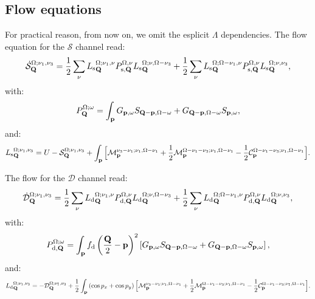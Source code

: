 \subsection{Flow equations}

For practical reason, from now on, we omit the esplicit $\Lambda$ dependencies.
The flow equation for the $\mathcal{S}$ channel read:
\begin{equation}
\dot{\mathcal{S}}_{\mathbf{Q}}^{\Omega;\nu_1,\nu_3} = 
  \frac{1}{2} \sum_{\nu}{L_\mathrm{s}}^{\Omega; \nu_1,\nu}_{\mathbf{Q}} P_{\mathrm{s},\mathbf{Q}}^{\Omega,\nu} {L_\mathrm{s}}^{\Omega; \nu,\Omega-\nu_3}_{\mathbf{Q}} 
+ \frac{1}{2} \sum_{\nu}{L_\mathrm{s}}^{\Omega; \Omega-\nu_1,\nu}_{\mathbf{Q}} P_{\mathrm{s},\mathbf{Q}}^{\Omega,\nu} {L_\mathrm{s}}^{\Omega; \nu,\nu_3}_{\mathbf{Q}},
\end{equation} 	   
with: 
\begin{equation}
P_{\mathbf{Q}}^{\Omega;\omega} = \int_{\mathbf{p}}  G_{\mathbf{p},\omega}S_{\mathbf{Q}-\mathbf{p},\Omega-\omega} +G_{\mathbf{Q}-\mathbf{p},\Omega-\omega}
S_{\mathbf{p},\omega}, 
\label{eq:app:P_pp}
\end{equation} 
and: 
\begin{align} 
{L_\mathrm{s}}^{\Omega;\nu_1,\nu_3}_{\mathbf{Q}}=U-\mathcal{S}_{\mathbf{Q}}^{\Omega;\nu_1,\nu_3}
+ \int_{\mathbf{p}}  \Big[ \mathcal{M}_{\mathbf{p}}^{\nu_3-\nu_1;\nu_1,\Omega-\nu_1} + \frac{1}{2} \mathcal{M}_{\mathbf{p}}^{\Omega-\nu_1-\nu_3;\nu_1,\Omega-\nu_1} - \frac{1}{2} \mathcal{C}_{\mathbf{p}}^{\Omega-\nu_1-\nu_3;\nu_1,\Omega-\nu_1} \Big]. 
\end{align}	 

The flow for the $\mathcal{D}$ channel read:
\begin{equation}
\dot{\mathcal{D}}_{\mathbf{Q}}^{\Omega;\nu_1,\nu_3} = 
  \frac{1}{2} \sum_{\nu}{L_\mathrm{d}}^{\Omega; \nu_1,\nu}_{\mathbf{Q}} P_{\mathrm{d},\mathbf{Q}}^{\Omega,\nu} {L_\mathrm{d}}^{\Omega; \nu,\Omega-\nu_3}_{\mathbf{Q}} 
+ \frac{1}{2} \sum_{\nu}{L_\mathrm{d}}^{\Omega; \Omega-\nu_1,\nu}_{\mathbf{Q}} P_{\mathrm{d},\mathbf{Q}}^{\Omega,\nu} {L_\mathrm{d}}^{\Omega; \nu,\nu_3}_{\mathbf{Q}},
\end{equation}
with: 
\begin{equation}
P_{\mathrm{d},\mathbf{Q}}^{\Omega;\omega} = \int_{\mathbf{p}}  f_{\mathrm{d}}\left(\frac{\mathbf{Q}}{2}-\mathbf{p}\right)^2 \left[ G_{\mathbf{p},\omega}S_{\mathbf{Q}-\mathbf{p},\Omega-\omega} +G_{\mathbf{Q}-\mathbf{p},\Omega-\omega}
S_{\mathbf{p},\omega} \right], 
\label{eq:app:P_pp}
\end{equation} 
and: 
\begin{align} 
{L_\mathrm{d}}^{\Omega;\nu_1,\nu_3}_{\mathbf{Q}}=-\mathcal{D}_{\mathbf{Q}}^{\Omega;\nu_1,\nu_3} 
+ \frac{1}{2}\int_{\mathbf{p}} \left(\cos{p_x}+\cos{p_y}\right) \Big[ \mathcal{M}_{\mathbf{p}}^{\nu_3-\nu_1;\nu_1,\Omega-\nu_1} + \frac{1}{2} \mathcal{M}_{\mathbf{p}}^{\Omega-\nu_1-\nu_3;\nu_1,\Omega-\nu_1} - \frac{1}{2} \mathcal{C}_{\mathbf{p}}^{\Omega-\nu_1-\nu_3;\nu_1,\Omega-\nu_1} \Big].
\end{align}	 

